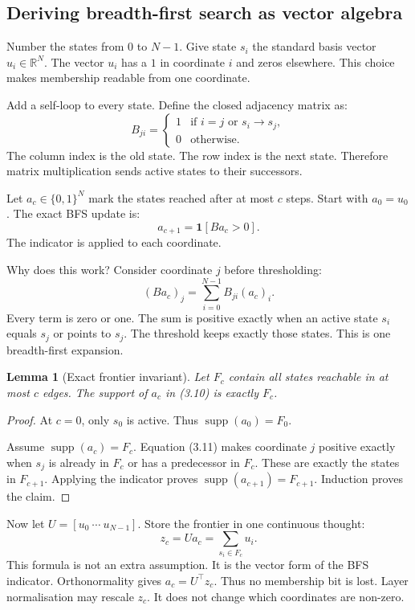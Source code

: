 \documentclass[11pt]{article}
\newtheorem{lemma}[theorem]{Lemma}
\theoremstyle{definition}
\begin{document}
\subsection{Deriving breadth-first search as vector algebra}

Number the states from $0$ to $N-1$. Give state $s_i$ the standard basis vector $u_i\in\mathbb R^N$. The vector $u_i$ has a $1$ in coordinate $i$ and zeros elsewhere. This choice makes membership readable from one coordinate.

Add a self-loop to every state. Define the closed adjacency matrix as:
\[
B_{ji}=
\begin{cases}
1 & \text{if }i=j\text{ or }s_i\to s_j,\\
0 & \text{otherwise.}
\end{cases}
\tag{3.9}
\]
The column index is the old state. The row index is the next state. Therefore matrix multiplication sends active states to their successors.

Let $a_c\in\{0,1\}^N$ mark the states reached after at most $c$ steps. Start with $a_0=u_0$. The exact BFS update is:
\[
a_{c+1}=\mathbf 1[B a_c>0].
\tag{3.10}
\]
The indicator is applied to each coordinate.

Why does this work? Consider coordinate $j$ before thresholding:
\[
(Ba_c)_j=\sum_{i=0}^{N-1} B_{ji}(a_c)_i.
\tag{3.11}
\]
Every term is zero or one. The sum is positive exactly when an active state $s_i$ equals $s_j$ or points to $s_j$. The threshold keeps exactly those states. This is one breadth-first expansion.

\begin{lemma}[Exact frontier invariant]
\label{lem:sql-frontier}
Let $F_c$ contain all states reachable in at most $c$ edges. The support of $a_c$ in (3.10) is exactly $F_c$.
\end{lemma}

\begin{proof}
At $c=0$, only $s_0$ is active. Thus $\operatorname{supp}(a_0)=F_0$.

Assume $\operatorname{supp}(a_c)=F_c$. Equation (3.11) makes coordinate $j$ positive exactly when $s_j$ is already in $F_c$ or has a predecessor in $F_c$. These are exactly the states in $F_{c+1}$. Applying the indicator proves $\operatorname{supp}(a_{c+1})=F_{c+1}$. Induction proves the claim.
\end{proof}

Now let $U=[u_0\ \cdots\ u_{N-1}]$. Store the frontier in one continuous thought:
\[
z_c=Ua_c=\sum_{s_i\in F_c}u_i.
\tag{3.12}
\]
This formula is not an extra assumption. It is the vector form of the BFS indicator. Orthonormality gives $a_c=U^\top z_c$. Thus no membership bit is lost. Layer normalisation may rescale $z_c$. It does not change which coordinates are non-zero.
\end{document}
